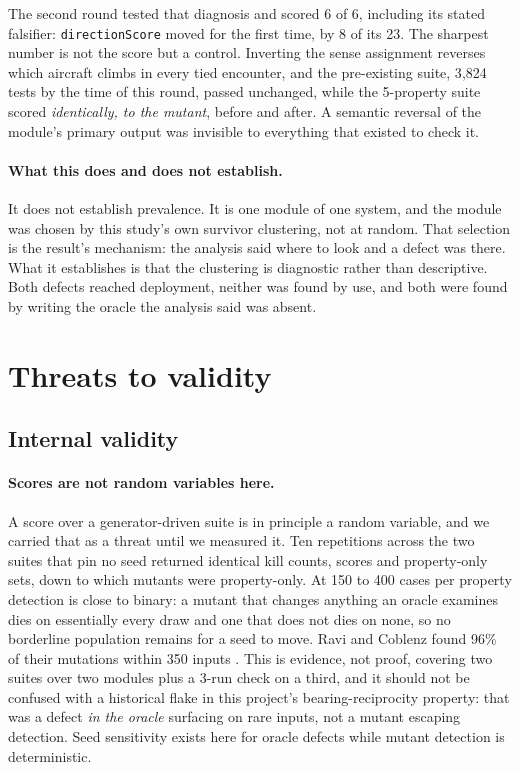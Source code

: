 \documentclass[12pt]{article}
\begin{document}
The second round tested that diagnosis and scored 6 of 6, including its stated
falsifier: \texttt{directionScore} moved for the first time, by 8 of its 23. The
sharpest number is not the score but a control. Inverting the sense assignment
reverses which aircraft climbs in every tied encounter, and the pre-existing suite,
3{,}824 tests by the time of this round, passed unchanged, while the 5-property suite scored
\emph{identically, to the mutant}, before and after. A semantic reversal of the
module's primary output was invisible to everything that existed to check it.

\paragraph{What this does and does not establish.} It does not establish
prevalence. It is one module of one system, and the module was chosen by this study's own survivor clustering, not at random. That selection is the result's mechanism: the analysis said where to look and
a defect was there. What it establishes is that the clustering is diagnostic
rather than descriptive. Both defects reached deployment, neither was found by
use, and both were found by writing the oracle the analysis said was absent.

\section{Threats to validity}
\label{sec:threats}

\subsection{Internal validity}

\paragraph{Scores are not random variables here.} A score over a
generator-driven suite is in principle a random variable, and we carried that as a
threat until we measured it. Ten repetitions across the two suites that pin no
seed returned identical kill counts, scores and property-only sets, down to which
mutants were property-only. At 150 to 400 cases per property detection is close to
binary: a mutant that changes anything an oracle examines dies on essentially
every draw and one that does not dies on none, so no borderline population remains for a seed to move. Ravi and Coblenz found 96\% of their mutations within
350 inputs \cite{ravi2025}. This is evidence, not proof, covering two suites over
two modules plus a 3-run check on a third, and it should not be confused with
a historical flake in this project's bearing-reciprocity property: that was a
defect \emph{in the oracle} surfacing on rare inputs, not a mutant escaping
detection. Seed sensitivity exists here for oracle defects while mutant detection
is deterministic.
\end{document}

